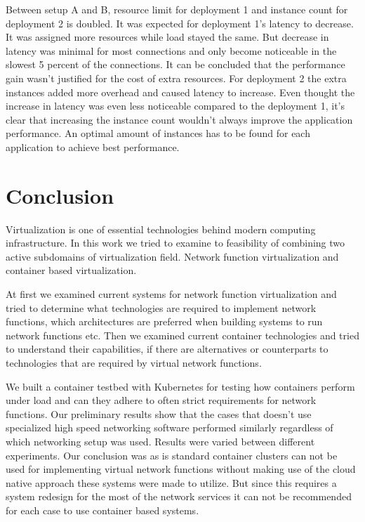 \documentclass[12pt,oneandhalf,chaparabic,ceng,ms,eng,oneside,pntc]{gsufbe}
\begin{document}
Between setup A and B, resource limit for deployment 1 and instance count for deployment 2 is doubled.
It was expected for deployment 1's latency to decrease. It was assigned more resources while load 
stayed the same. But decrease in latency was minimal for most connections and only become noticeable
in the slowest 5 percent of the connections. It can be concluded that the performance gain wasn't
justified for the cost of extra resources.
For deployment 2 the extra instances added more overhead and caused latency to increase. Even thought
the increase in latency was even less noticeable compared to the deployment 1, it's clear that
increasing the instance count wouldn't always improve the application performance. An optimal amount
of instances has to be found for each application to achieve best performance.

\chapter{Conclusion}
Virtualization is one of essential technologies behind modern computing infrastructure.  In this work we
tried to examine to feasibility of combining two active subdomains of virtualization field.  Network
function virtualization and container based virtualization.

At first we examined current systems for network function virtualization and tried to determine what
technologies are required to implement network functions, which architectures are preferred when
building systems to run network functions etc. Then we examined current container technologies and
tried to understand their capabilities, if there are alternatives or counterparts to technologies that
are required by virtual network functions.

We built a container testbed with Kubernetes for testing how containers perform under load and can they
adhere to often strict requirements for network functions.  Our preliminary results show that the cases
that doesn't use specialized high speed networking software performed similarly regardless of which
networking setup was used.  Results were varied between different experiments.  Our conclusion was as is
standard container clusters can not be used for implementing virtual network functions without making use
of the cloud native approach these systems were made to utilize. But since this requires a system redesign
for the most of the network services it can not be recommended for each case to use container based systems.
\end{document}
